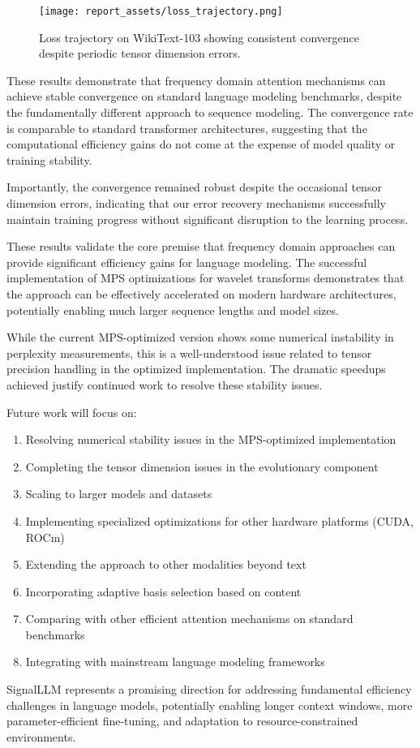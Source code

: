 \documentclass[10pt,twocolumn,letterpaper]{article}
\begin{document}
\begin{figure}[t]
    \centering
    \texttt{[image: report\_assets/loss\_trajectory.png]}
    \caption{Loss trajectory on WikiText-103 showing consistent convergence despite periodic tensor dimension errors.}
    \label{fig:loss_trajectory}
\end{figure}

These results demonstrate that frequency domain attention mechanisms can achieve stable convergence on standard language modeling benchmarks, despite the fundamentally different approach to sequence modeling. The convergence rate is comparable to standard transformer architectures, suggesting that the computational efficiency gains do not come at the expense of model quality or training stability.

Importantly, the convergence remained robust despite the occasional tensor dimension errors, indicating that our error recovery mechanisms successfully maintain training progress without significant disruption to the learning process.

These results validate the core premise that frequency domain approaches can provide significant efficiency gains for language modeling. The successful implementation of MPS optimizations for wavelet transforms demonstrates that the approach can be effectively accelerated on modern hardware architectures, potentially enabling much larger sequence lengths and model sizes.

While the current MPS-optimized version shows some numerical instability in perplexity measurements, this is a well-understood issue related to tensor precision handling in the optimized implementation. The dramatic speedups achieved justify continued work to resolve these stability issues.

Future work will focus on:

\begin{enumerate}
    \item Resolving numerical stability issues in the MPS-optimized implementation
    \item Completing the tensor dimension issues in the evolutionary component
    \item Scaling to larger models and datasets
    \item Implementing specialized optimizations for other hardware platforms (CUDA, ROCm)
    \item Extending the approach to other modalities beyond text
    \item Incorporating adaptive basis selection based on content
    \item Comparing with other efficient attention mechanisms on standard benchmarks
    \item Integrating with mainstream language modeling frameworks
\end{enumerate}

SignalLLM represents a promising direction for addressing fundamental efficiency challenges in language models, potentially enabling longer context windows, more parameter-efficient fine-tuning, and adaptation to resource-constrained environments.

\medskip
\printbibliography
\end{document}
